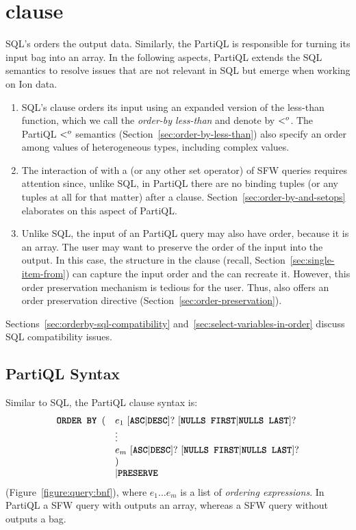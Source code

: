 \section{ clause}
\label{section:order-by}
SQL's  orders the output data. Similarly, the PartiQL 
is responsible for turning its input bag into an array. In the following
aspects, PartiQL extends the SQL semantics to resolve issues that are not
relevant in SQL but emerge when working on Ion data.
%
\begin{enumerate}
%
\item SQL's  clause orders its input using an expanded version of
the less-than function, which we call the {\em order-by less-than} and denote by
$<^o$. The PartiQL $<^o$ semantics (Section~\ref{sec:order-by-less-than})
also specify an order among values of heterogeneous types, including complex
values.
%
\item The interaction of  with a  (or any other set
operator) of SFW queries requires attention since, unlike SQL, in PartiQL there
are no binding tuples (or any tuples at all for that matter) after a  clause. Section~\ref{sec:order-by-and-setops} elaborates on this aspect
of PartiQL.
%
\item Unlike SQL, the input of an PartiQL query may also have order, because it
is an array. The user may want to preserve the order of the input into the
output. In this case, the  structure in the  clause (recall,
Section~\ref{sec:single-item-from}) can capture the input order and the
 can recreate it. However, this order preservation mechanism is
tedious for the user. Thus,  also offers an order preservation
directive (Section~\ref{sec:order-preservation}).
%
\end{enumerate}

Sections~\ref{sec:orderby-sql-compatibility}
and~\ref{sec:select-variables-in-order} discuss SQL compatibility issues.


\subsection{PartiQL  Syntax}
\label{sec:orderby-syntax}
Similar to SQL, the PartiQL  clause syntax is: 
\[
\begin{array}{ll}
\texttt{\textbf{ORDER BY }}( & e_1\ [\texttt{\textbf{ASC}} | \texttt{\textbf{DESC}}]?\ [\texttt{\textbf{NULLS FIRST}}|\texttt{\textbf{NULLS LAST}}]? \\
 & \vdots \\
 & e_m\ [\texttt{\textbf{ASC}} | \texttt{\textbf{DESC}}]?\ [\texttt{\textbf{NULLS FIRST}}|\texttt{\textbf{NULLS LAST}}]? \\
 &) \\
 &| \texttt{\textbf{PRESERVE}}
\end{array}
\] 
\noindent (Figure~\ref{figure:query:bnf}), where $e_1 \ldots e_m$ is a list of
\textit{ordering expressions}.  In PartiQL a SFW query with 
outputs an array, whereas a SFW query without  outputs a bag. 

